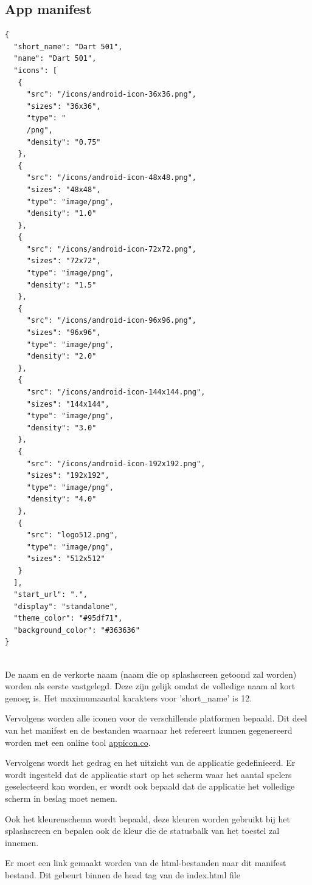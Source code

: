 	\subsection{App manifest}
\begin{lstlisting}
{
  "short_name": "Dart 501",
  "name": "Dart 501",
  "icons": [
   {
     "src": "/icons/android-icon-36x36.png",
     "sizes": "36x36",
     "type": "
     /png",
     "density": "0.75"
   },
   {
     "src": "/icons/android-icon-48x48.png",
     "sizes": "48x48",
     "type": "image/png",
     "density": "1.0"
   },
   {
     "src": "/icons/android-icon-72x72.png",
     "sizes": "72x72",
     "type": "image/png",
     "density": "1.5"
   },
   {
     "src": "/icons/android-icon-96x96.png",
     "sizes": "96x96",
     "type": "image/png",
     "density": "2.0"
   },
   {
     "src": "/icons/android-icon-144x144.png",
     "sizes": "144x144",
     "type": "image/png",
     "density": "3.0"
   },
   {
     "src": "/icons/android-icon-192x192.png",
     "sizes": "192x192",
     "type": "image/png",
     "density": "4.0"
   },
   {
     "src": "logo512.png",
     "type": "image/png",
     "sizes": "512x512"
   }
  ],
  "start_url": ".",
  "display": "standalone",
  "theme_color": "#95df71",
  "background_color": "#363636"
}
	
\end{lstlisting}
		
		De naam en de verkorte naam (naam die op splashscreen getoond zal worden) worden als eerste vastgelegd. Deze zijn gelijk omdat de volledige naam al kort genoeg is. Het maximumaantal karakters voor 'short\_name' is 12.
 
		
		Vervolgens worden alle iconen voor de verschillende platformen bepaald. Dit deel van het manifest en de bestanden waarnaar het refereert kunnen gegenereerd worden met een online tool \href{https://appicon.co}{appicon.co}.
		
		Vervolgens wordt het gedrag en het uitzicht van de applicatie gedefinieerd. Er wordt ingesteld dat de applicatie start op het scherm waar het aantal spelers geselecteerd kan worden, er wordt ook bepaald dat de applicatie het volledige scherm in beslag moet nemen.
		
		Ook het kleurenschema wordt bepaald, deze kleuren worden gebruikt bij het splashscreen en bepalen ook de kleur die de statusbalk van het toestel zal innemen. 
		
		Er moet een link gemaakt worden van de html-bestanden naar dit manifest bestand. Dit gebeurt binnen de head tag van de index.html file
		
